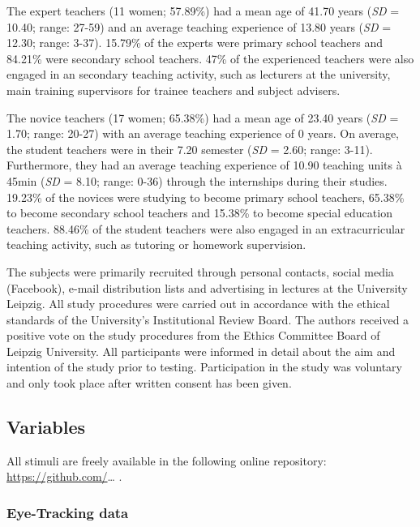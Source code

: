 \documentclass[
  man]{apa6}
\begin{document}
The expert teachers (11 women; 57.89\%) had a mean age of 41.70 years (\emph{SD} = 10.40; range: 27-59) and an average teaching experience of 13.80 years (\emph{SD} = 12.30; range: 3-37).
15.79\% of the experts were primary school teachers and 84.21\% were secondary school teachers. 47\% of the experienced teachers were also engaged in an secondary teaching activity, such as lecturers at the university, main training supervisors for trainee teachers and subject advisers.

The novice teachers (17 women; 65.38\%) had a mean age of 23.40 years (\emph{SD} = 1.70; range: 20-27) with an average teaching experience of 0 years. On average, the student teachers were in their 7.20 semester (\emph{SD} = 2.60; range: 3-11). Furthermore, they had an average teaching experience of 10.90 teaching units à 45min (\emph{SD} = 8.10; range: 0-36) through the internships during their studies.
19.23\% of the novices were studying to become primary school teachers, 65.38\% to become secondary school teachers and 15.38\% to become special education teachers. 88.46\% of the student teachers were also engaged in an extracurricular teaching activity, such as tutoring or homework supervision.

The subjects were primarily recruited through personal contacts, social media (Facebook), e-mail distribution lists and advertising in lectures at the University Leipzig. All study procedures were carried out in accordance with the ethical standards of the University's Institutional Review Board. The authors received a positive vote on the study procedures from the Ethics Committee Board of Leipzig University. All participants were informed in detail about the aim and intention of the study prior to testing. Participation in the study was voluntary and only took place after written consent has been given.

\hypertarget{section}{%
\subsection{}\label{section}}

\hypertarget{variables}{%
\subsection{Variables}\label{variables}}

All stimuli are freely available in the following online repository: \url{https://github.com/}\ldots{} .

\hypertarget{eye-tracking-data}{%
\subsubsection{Eye-Tracking data}\label{eye-tracking-data}}
\end{document}
